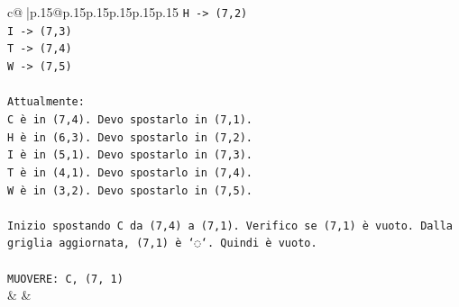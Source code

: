 \documentclass{article}
\begin{document}
{\begin{supertabular}{c@{$\;$}|p{.15\linewidth}@{}p{.15\linewidth}p{.15\linewidth}p{.15\linewidth}p{.15\linewidth}p{.15\linewidth}}
{{{\texttt{H {-}> (7,2)} \\
\texttt{I {-}> (7,3)} \\
\texttt{T {-}> (7,4)} \\
\texttt{W {-}> (7,5)} \\
\\ 
\texttt{Attualmente:} \\
\texttt{C è in (7,4). Devo spostarlo in (7,1).} \\
\texttt{H è in (6,3). Devo spostarlo in (7,2).} \\
\texttt{I è in (5,1). Devo spostarlo in (7,3).} \\
\texttt{T è in (4,1). Devo spostarlo in (7,4).} \\
\texttt{W è in (3,2). Devo spostarlo in (7,5).} \\
\\ 
\texttt{Inizio spostando C da (7,4) a (7,1). Verifico se (7,1) è vuoto. Dalla griglia aggiornata, (7,1) è `◌`. Quindi è vuoto.} \\
\\ 
\texttt{MUOVERE: C, (7, 1)} \\
            }
        }
    }
    & & \\ \\


\end{supertabular}}
\end{document}
